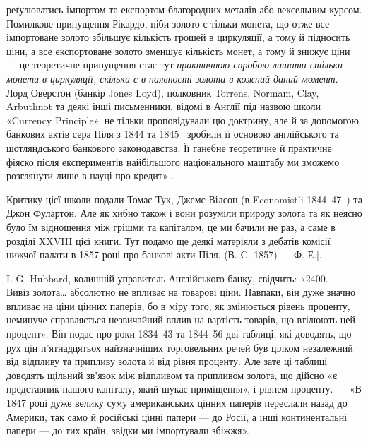 \parcont{}  %
реґулюватись імпортом та експортом благородних металів або вексельним курсом.
Помилкове припущення Рікардо, ніби золото є тільки монета, що отже все імпортоване
золото збільшує кількість грошей в циркуляції, а тому й підносить ціни,
а все експортоване золото зменшує кількість монет, а тому й знижує ціни —
це теоретичне припущення стає тут \emph{практичною спробою лишати стільки
монети в циркуляції, скільки є в наявності золота в кожний даний
момент}. Лорд Оверстон (банкір Jones Loyd), полковник Torrens, Normam, Clay,
Arbuthnot та деякі інші письменники, відомі в Англії під назвою школи «Currency
Principle», не тільки проповідували цю доктрину, але й за допомогою банкових
актів сера Піля з 1844 та 1845~ зробили її основою англійського та шотляндського
банкового законодавства. Її ганебне теоретичне й практичне фіяско після
експериментів найбільшого національного маштабу ми зможемо розглянути лише
в науці про кредит» .

Критику цієї школи подали Томас Тук, Джемс Вілсон (в Economist’i 1844--47~)
та Джон Фулартон. Але як хибно також і вони розуміли природу золота
та як неясно було їм відношення між грішми та капіталом, це ми бачили не
раз, а саме в розділі XXVIII цієї книги. Тут подамо ще деякі матеріяли з дебатів
комісії нижчої палати в 1857 році про банкові акти Піля. (В. C. 1857) — Ф. Е.].

I. G. Hubbard, колишній управитель Англійського банку, свідчить: «2400. —
Вивіз золота\dots{} абсолютно не впливає на товарові ціни. Навпаки, він дуже
значно впливає на ціни цінних паперів, бо в міру того, як змінюється рівень
проценту, неминуче справляється незвичайний вплив на вартість товарів, що втілюють
цей процент». Він подає про роки 1834--43 та 1844--56 дві таблиці,
які доводять, що рух цін п’ятнадцятьох найзначніших торговельних речей був
цілком незалежний від відпливу та припливу золота й від рівня проценту. Але
зате ці таблиці доводять щільний зв’язок між відпливом та припливом золота,
що дійсно «є представник нашого капіталу, який шукає приміщення», і рівнем
проценту. — «В 1847 році дуже велику суму американських цінних паперів переслали
назад до Америки, так само й російські цінні папери — до Росії, а інші
континентальні папери — до тих країн, звідки ми імпортували збіжжя».

